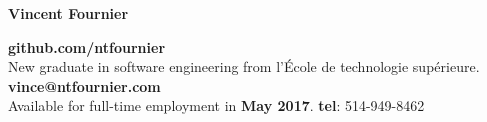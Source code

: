 \documentclass{res}
\newcommand{\inFrench}[1]{}
\newcommand{\inEnglish}[1]{#1}
\begin{document}
\thispagestyle{empty} %

{\bf\huge Vincent Fournier}
\inFrench{
	\hfill \textbf {github.com/ntfournier} \\
	Nouveau diplomé en génie logiciel de l’École de technologie supérieure.
	\hfill \textbf {vince@ntfournier.com} \\
	Disponible pour emploi temps plein à partir de \textbf{mai 2017}.
	\hfill \textbf {tel}: 514-949-8462 \\
}
\inEnglish{
	\hfill \textbf {github.com/ntfournier} \\
	New graduate in software engineering from l'École de technologie supérieure.
	\hfill \textbf {vince@ntfournier.com} \\
	Available for full-time employment in \textbf{May 2017}.
	\hfill \textbf {tel}: 514-949-8462 \\
}
\vspace{-15pt}
\end{document}
